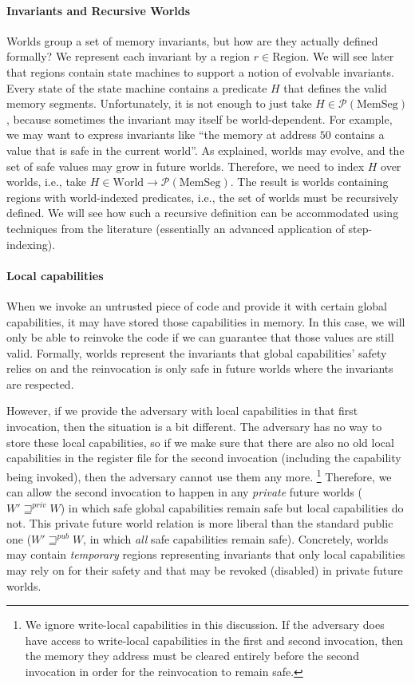 \documentclass[format=acmsmall, review=true, screen=true]{acmart}
\newcommand{\powerset}[1]{\mathcal{P}(#1)}
\newcommand{\var}[1]{\mathit{#1}}
\newcommand{\futurewk}{\mathbin{\sqsupseteq}^{\var{pub}}}
\newcommand{\futurestr}{\mathbin{\sqsupseteq}^{\var{priv}}}
\newcommand{\plaindom}[1]{\mathrm{#1}}
\newcommand{\HeapSegments}{\plaindom{MemSeg}}
\newcommand{\MemSegments}{\HeapSegments}
\newcommand{\Regions}{\plaindom{Region}}
\newcommand{\Worlds}{\plaindom{World}}
\newenvironment{toplas}{}{}
\begin{document}
\begin{toplas}
\paragraph{Invariants and Recursive Worlds}
Worlds group a set of memory invariants, but how are they actually
defined formally? We represent each invariant by a region
$r \in \Regions$. We will see later that regions contain state
machines to support a notion of evolvable invariants. Every
state of the state machine contains a predicate $H$ that defines the valid
memory segments.
Unfortunately, it is not enough to just take
$H \in \powerset{\MemSegments}$, because sometimes the invariant may
itself be world-dependent. For example, we may want to express
invariants like ``the memory at address $50$ contains a value that is
safe in the current world''. As explained, worlds may evolve, and the
set of safe values may grow in future worlds. Therefore, we need to
index $H$ over worlds, i.e., take
$H \in \Worlds \rightarrow \powerset{\MemSegments}$. The result is worlds containing regions with world-indexed predicates,
i.e., the set of worlds must be recursively defined. We will see how such a recursive
definition can be accommodated using techniques from the
literature (essentially an advanced application of step-indexing).

\paragraph{Local capabilities}
When we invoke an untrusted piece of code and provide it with certain global capabilities, it may have stored those capabilities in memory.
In this case, we will only be able to reinvoke the code if we can guarantee that those values are still valid.
Formally, worlds represent the invariants that global capabilities' safety relies on and the reinvocation is only safe in future worlds where the invariants are respected.

However, if we provide the adversary with local capabilities in that first invocation, then the situation is a bit different. The adversary has no way to store these local capabilities, so if we make sure that there are also no old local capabilities in the register file for the second invocation (including the capability being invoked), then the adversary cannot use them any more.%
\footnote{We ignore write-local capabilities in this discussion.
  If the adversary does have access to write-local capabilities in the first and second invocation, then the memory they address must be cleared entirely before the second invocation in order for the reinvocation to remain safe.}
Therefore, we can allow the second invocation to happen in any \emph{private} future worlds ($W' \futurestr W$) in which safe global capabilities remain safe but local capabilities do not.
This private future world relation is more liberal than the standard public one ($W' \futurewk W$, in which \emph{all} safe capabilities remain safe).
Concretely, worlds may contain \emph{temporary} regions representing invariants that only local capabilities may rely on for their safety and that may be revoked (disabled) in private future worlds.


\end{toplas}
\end{document}
